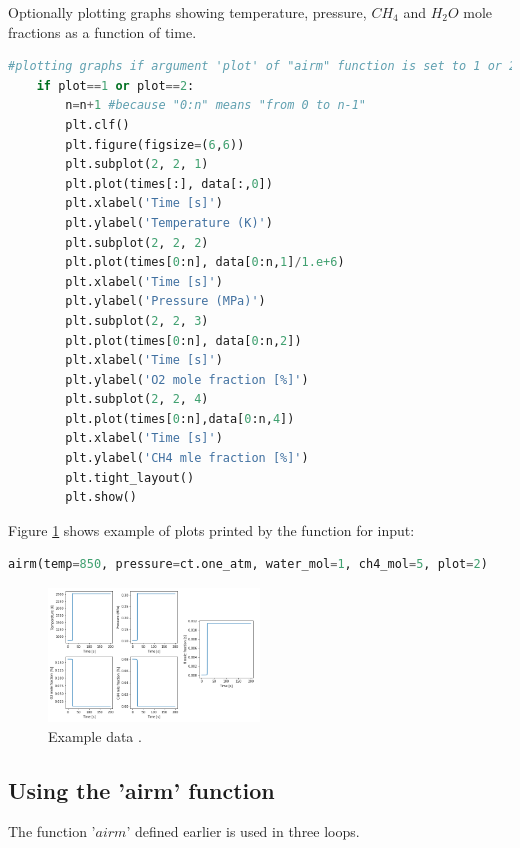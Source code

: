 \documentclass[a4paper]{article}
\begin{document}
Optionally plotting graphs showing temperature, pressure, $CH_4$ and $H_2O$ mole fractions as a function of time.
\begin{lstlisting}[language=python]
    #plotting graphs if argument 'plot' of "airm" function is set to 1 or 2
    if plot==1 or plot==2:
        n=n+1 #because "0:n" means "from 0 to n-1"
        plt.clf()
        plt.figure(figsize=(6,6))
        plt.subplot(2, 2, 1)
        plt.plot(times[:], data[:,0])
        plt.xlabel('Time [s]')
        plt.ylabel('Temperature (K)')
        plt.subplot(2, 2, 2)
        plt.plot(times[0:n], data[0:n,1]/1.e+6)
        plt.xlabel('Time [s]')
        plt.ylabel('Pressure (MPa)')
        plt.subplot(2, 2, 3)
        plt.plot(times[0:n], data[0:n,2])
        plt.xlabel('Time [s]')
        plt.ylabel('O2 mole fraction [%]')
        plt.subplot(2, 2, 4)
        plt.plot(times[0:n],data[0:n,4])
        plt.xlabel('Time [s]')
        plt.ylabel('CH4 mle fraction [%]')
        plt.tight_layout()
        plt.show()
\end{lstlisting}

Figure \ref{fig:example} shows example of plots printed by the function for input:
\begin{lstlisting}[language=python]
airm(temp=850, pressure=ct.one_atm, water_mol=1, ch4_mol=5, plot=2)
\end{lstlisting}
\begin{figure}[h!]
\centering
\includegraphics[width=0.5\textwidth]{example_data.png}
\caption{\label{fig:example}Example data .}
\end{figure}

\subsection{Using the 'airm' function}
The function '$airm$' defined earlier is used in three loops.
\end{document}
